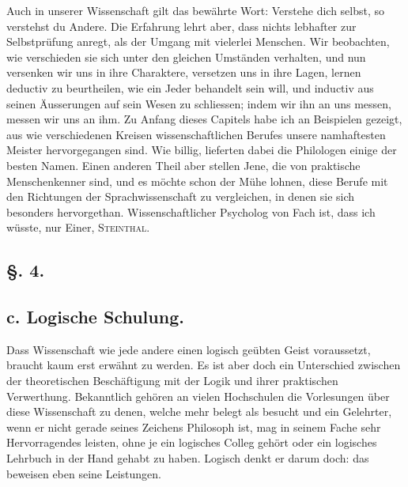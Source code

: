 Auch in unserer Wissenschaft gilt das bewährte Wort: Verstehe dich selbst, so verstehst du Andere. Die Erfahrung lehrt aber, dass nichts lebhafter zur Selbstprüfung anregt, als der Umgang mit vielerlei Menschen. Wir beobachten, wie verschieden sie sich unter den gleichen Umständen verhalten, und nun versenken wir uns in ihre Charaktere, versetzen uns in ihre Lagen, lernen deductiv zu beurtheilen, wie ein Jeder behandelt sein will, und inductiv aus seinen Äusserungen auf sein Wesen zu schliessen; indem wir ihn an uns messen, messen wir uns an ihm. Zu Anfang dieses Capitels habe ich an Beispielen gezeigt, aus wie verschiedenen Kreisen wissenschaftlichen Berufes unsere namhaftesten Meister hervorgegangen sind. Wie billig, lieferten dabei die Philologen einige der besten Namen. Einen anderen Theil aber stellen Jene, die von  praktische Menschenkenner sind, und es möchte schon der Mühe lohnen, diese Berufe mit den Richtungen der Sprachwissenschaft zu vergleichen, in denen sie sich besonders hervorgethan. Wissenschaftlicher Psycholog von Fach ist, dass ich wüsste, nur Einer,  \textsc{Steinthal}.

\begin{styleAnmerk}
\end{styleAnmerk}

\label{sp.47}

\subsection*{§. 4.}\label{I.V.4}
\subsection*{c. Logische Schulung.}

Dass  Wissenschaft wie jede andere einen logisch geübten Geist voraussetzt, braucht kaum erst erwähnt zu werden. Es ist aber doch ein Unterschied zwischen der theoretischen Beschäftigung mit der Logik und ihrer praktischen Verwerthung. Bekanntlich gehören an vielen Hochschulen die Vorlesungen über diese Wissenschaft zu denen, welche mehr belegt als besucht  und ein Gelehrter, wenn er nicht gerade seines Zeichens Philosoph ist, mag in seinem Fache sehr Hervorragendes leisten, ohne je ein logisches Colleg gehört oder ein logisches Lehrbuch in der Hand gehabt zu haben. Logisch denkt er darum doch: das beweisen eben seine Leistungen.

